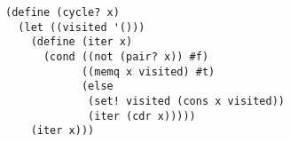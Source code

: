 \documentclass[a4paper,12pt]{article}
\begin{document}
\begin{lstlisting}
(define (cycle? x)
  (let ((visited '()))
    (define (iter x)
      (cond ((not (pair? x)) #f)
            ((memq x visited) #t)
            (else
             (set! visited (cons x visited))
             (iter (cdr x)))))
    (iter x)))
\end{lstlisting}
\end{document}
